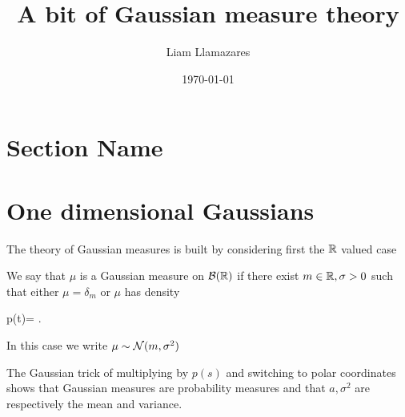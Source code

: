 \documentclass[
    a4paper,
    DIV=14,
    abstract=true,
    numbers=noenddot
]{scrartcl}
\begin{document}
\title{A bit of Gaussian measure theory }
\author{Liam Llamazares }
\date{\today}
\maketitle
\section{Section Name}


\section{One dimensional Gaussians}
The theory of Gaussian measures is built by considering first the $\mathbb{R}$ valued case 
\begin{definition}
    We say that $\mu$ is a Gaussian measure on $\mathcal{B}(\mathbb{R})$ if there exist $m \in \mathbb{R}, \sigma>0$ such that either $\mu=\delta_m$ or $\mu$ has density 
    \begin{aligneq}\label{density}
        p(t)= .
    \end{aligneq}
    In this case we write $\mu \sim \mathcal{N}(m, \sigma^2)$
\end{definition}
The Gaussian trick of multiplying by $p(s)$ and switching to polar coordinates shows that Gaussian measures are probability measures and that $a, \sigma^2$ are respectively the mean and variance.
\end{document}
